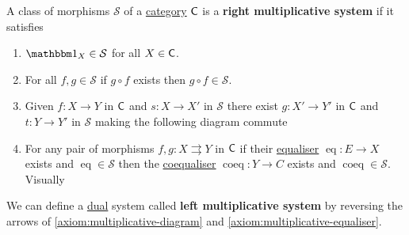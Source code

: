 \documentclass[../../main]{subfiles}
\begin{document}
\begin{definition}\label{def:multiplicative-system}
  A class of morphisms \(\mathcal{S}\) of a \hyperref[def:category]{category} \(\mathsf{C}\) is a \textbf{right multiplicative system} if it satisfies
  \begin{enumerate}[label=S.\arabic*), ref=S.\arabic*]
    \item\label{axiom:multiplicative-id} \(\id_{X} \in \mathcal{S}\) for all \(X \in \mathsf{C}\).
    \item\label{axiom:multiplicative-composition} For all \(f, g \in \mathcal{S}\) if \(g \circ f\) exists then \(g \circ f \in \mathcal{S}\).
    \item\label{axiom:multiplicative-diagram} Given \(f: X \to Y\) in \(\mathsf{C}\) and \(s: X \to X'\) in \(\mathcal{S}\) there exist \(g: X' \to Y'\) in \(\mathsf{C}\) and \(t: Y \to Y'\) in \(\mathcal{S}\) making the following diagram commute
          \begin{center}
          \end{center}
    \item\label{axiom:multiplicative-equaliser} For any pair of morphisms \(f, g: X \rightrightarrows Y\) in \(\mathsf{C}\) if their \hyperref[def:equaliser]{equaliser} \(\operatorname{eq}: E \to X\) exists and \(\operatorname{eq} \in \mathcal{S}\) then the \hyperref[def:coequaliser]{coequaliser} \(\operatorname{coeq}: Y \to C\) exists and \(\operatorname{coeq} \in \mathcal{S}\).
          Visually
          \begin{center}
          \end{center}
  \end{enumerate}

  We can define a \hyperref[def:dual]{dual} system called \textbf{left multiplicative system} by reversing the arrows of \ref{axiom:multiplicative-diagram} and \ref{axiom:multiplicative-equaliser}.
\end{definition}
\end{document}

